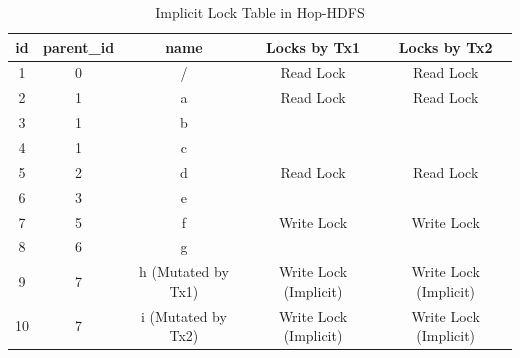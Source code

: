 \begin{table}[h]
	\centering
	\begin{tabular}{|c|c|c|c|c|}
		\hline
		\textbf{id} & \textbf{parent\_id} & \textbf{name} & \textbf{Locks by Tx1} & \textbf{Locks by Tx2} \\ \hline
		1 & 0 & / & Read Lock & Read Lock \\ \hline
		2 & 1 & a & Read Lock & Read Lock \\ \hline
		3 & 1 & b & ~ & ~ \\ \hline
		4 & 1 & c & ~ & ~ \\ \hline
		5 & 2 & d & Read Lock & Read Lock\\ \hline
		6 & 3 & e & ~ & ~ \\ \hline
		7 & 5 & f  & Write Lock & Write Lock \\ \hline
		8 & 6 & g & ~ & ~ \\ \hline
		9 & 7 & h (Mutated by Tx1) & Write Lock (Implicit) & Write Lock (Implicit)\\ \hline
		10 & 7 & i (Mutated by Tx2) & Write Lock (Implicit) & Write Lock (Implicit)\\ \hline
	\end{tabular}
	\caption{Implicit Lock Table in Hop-HDFS}
	\label{table:hoplockTable}
\end{table}